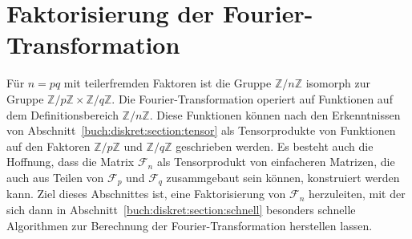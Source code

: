 %
%
%
\section{Faktorisierung der Fourier-Transformation
\label{buch:diskret:section:vandermonde}}
Für $n=pq$ mit teilerfremden Faktoren ist die Gruppe
$\mathbb{Z}/n\mathbb{Z}$ isomorph zur Gruppe
$\mathbb{Z}/p\mathbb{Z}\times \mathbb{Z}/q\mathbb{Z}$.
Die Fourier-Transformation operiert auf Funktionen auf
dem Definitionsbereich $\mathbb{Z}/n\mathbb{Z}$.
Diese Funktionen können nach den Erkenntnissen von
Abschnitt~\ref{buch:diskret:section:tensor} als Tensorprodukte
von Funktionen auf den Faktoren $\mathbb{Z}/p\mathbb{Z}$
und $\mathbb{Z}/q\mathbb{Z}$ geschrieben werden.
Es besteht auch die Hoffnung, dass die Matrix $\mathscr{F}_n$
als Tensorprodukt von einfacheren Matrizen, die auch aus Teilen von 
$\mathscr{F}_p$ und $\mathscr{F}_q$ zusammgebaut sein können,
konstruiert werden kann.
Ziel dieses Abschnittes ist, eine Faktorisierung von $\mathscr{F}_n$
herzuleiten, mit der sich dann in
Abschnitt~\ref{buch:diskret:section:schnell}
besonders schnelle Algorithmen zur Berechnung der Fourier-Transformation
herstellen lassen.








